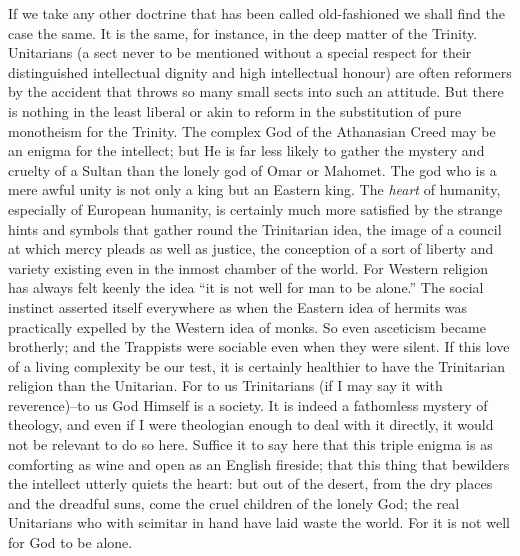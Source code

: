 \documentclass{book}
\begin{document}
If we take any other doctrine that has been called old-fashioned we shall find the case the same. It is the same, for instance, in the deep matter of the Trinity. Unitarians (a sect never to be mentioned without a special respect for their distinguished intellectual dignity and high intellectual honour) are often reformers by the accident that throws so many small sects into such an attitude. But there is nothing in the least liberal or akin to reform in the substitution of pure monotheism for the Trinity. The complex God of the Athanasian Creed may be an enigma for the intellect; but He is far less likely to gather the mystery and cruelty of a Sultan than the lonely god of Omar or Mahomet. The god who is a mere awful unity is not only a king but an Eastern king. The \emph{heart} of humanity, especially of European humanity, is certainly much more satisfied by the strange hints and symbols that gather round the Trinitarian idea, the image of a council at which mercy pleads as well as justice, the conception of a sort of liberty and variety existing even in the inmost chamber of the world. For Western religion has always felt keenly the idea “it is not well for man to be alone.” The social instinct asserted itself everywhere as when the Eastern idea of hermits was practically expelled by the Western idea of monks. So even asceticism became brotherly; and the Trappists were sociable even when they were silent. If this love of a living complexity be our test, it is certainly healthier to have the Trinitarian religion than the Unitarian. For to us Trinitarians (if I may say it with reverence)–to us God Himself is a society. It is indeed a fathomless mystery of theology, and even if I were theologian enough to deal with it directly, it would not be relevant to do so here. Suffice it to say here that this triple enigma is as comforting as wine and open as an English fireside; that this thing that bewilders the intellect utterly quiets the heart: but out of the desert, from the dry places and the dreadful suns, come the cruel children of the lonely God; the real Unitarians who with scimitar in hand have laid waste the world. For it is not well for God to be alone.
\end{document}
